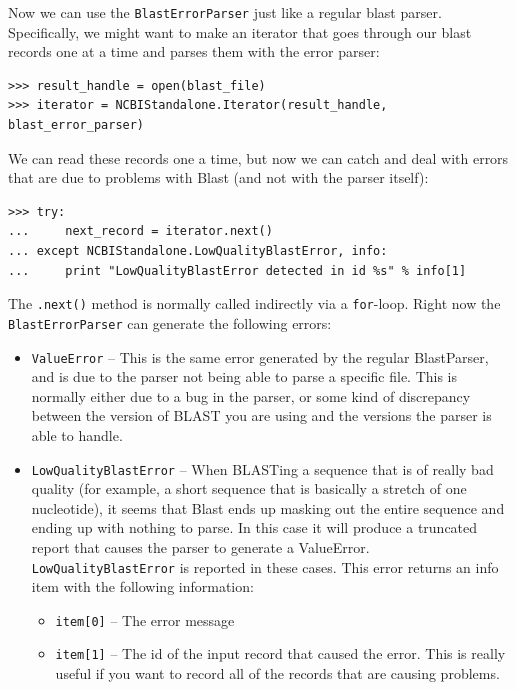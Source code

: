 \documentclass{report}
\begin{document}
Now we can use the \verb|BlastErrorParser| just like a regular blast parser. Specifically, we might want to make an iterator that goes through our blast records one at a time and parses them with the error parser:

\begin{verbatim}
>>> result_handle = open(blast_file)
>>> iterator = NCBIStandalone.Iterator(result_handle, blast_error_parser)
\end{verbatim}

We can read these records one a time, but now we can catch and deal with errors that are due to problems with Blast (and not with the parser itself):

\begin{verbatim}
>>> try:
...     next_record = iterator.next()
... except NCBIStandalone.LowQualityBlastError, info:
...     print "LowQualityBlastError detected in id %s" % info[1]
\end{verbatim}

The \verb|.next()| method is normally called indirectly via a \verb|for|-loop.
Right now the \verb|BlastErrorParser| can generate the following errors:

\begin{itemize}
  \item \verb|ValueError| -- This is the same error generated by the regular BlastParser, and is due to the parser not being able to parse a specific file. This is normally either due to a bug in the parser, or some kind of discrepancy between the version of BLAST you are using and the versions the parser is able to handle.

  \item \verb|LowQualityBlastError| -- When BLASTing a sequence that is of really bad quality (for example, a short sequence that is basically a stretch of one nucleotide), it seems that Blast ends up masking out the entire sequence and ending up with nothing to parse. In this case it will produce a truncated report that causes the parser to generate a ValueError. \verb|LowQualityBlastError| is reported in these cases. This error returns an info item with the following information:
  \begin{itemize}
    \item \verb|item[0]| -- The error message
    \item \verb|item[1]| -- The id of the input record that caused the error. This is really useful if you want to record all of the records that are causing problems.
  \end{itemize}
\end{itemize}
\end{document}
